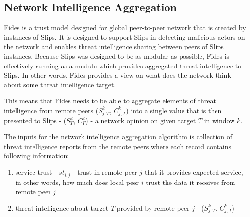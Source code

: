 \subsection{Network Intelligence Aggregation}
Fides is a trust model designed for global peer-to-peer network that is created by instances of Slips.
It is designed to support Slips in detecting malicious actors on the network and enables threat intelligence sharing between peers of Slips instances.
Because Slips was designed to be as modular as possible, Fides is effectively running as a module which provides aggregated threat intelligence to Slips. 
In other words, Fides provides a view on what does the network think about some threat intelligence target.

This means that Fides needs to be able to aggregate elements of threat intelligence from remote peers ($S^{k}_{j, T}$, $C^{k}_{j, T}$) into a single value that is then presented to Slips - ($S^{k}_{T}$, $C^{k}_{T}$) - a network opinion on given target $T$ in window $k$.
\vspace{5mm}

\noindent
The inputs for the network intelligence aggregation algorithm is collection of threat intelligence reports from the remote peers where each record contains following information:
\begin{enumerate}
\item service trust - $st_{i, j}$ - trust in remote peer $j$ that it provides expected service, in other words, how much does local peer $i$ trust the data it receives from remote peer $j$
\item threat intelligence about target $T$ provided by remote peer $j$ - ($S^{k}_{j, T}$, $C^{k}_{j, T}$)
\end{enumerate}